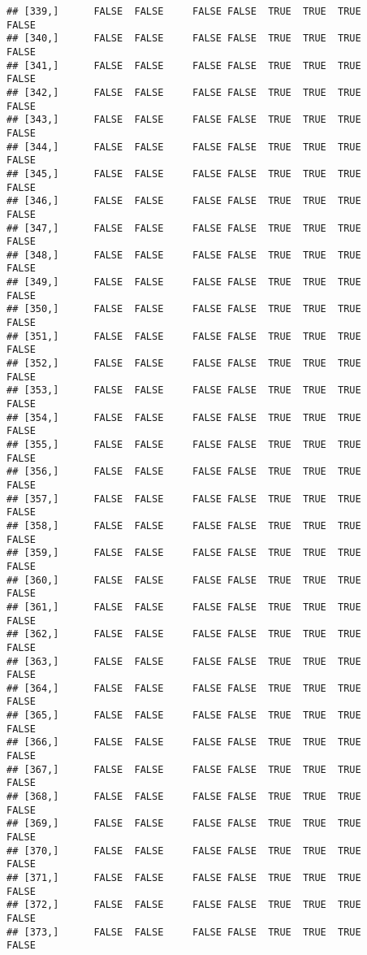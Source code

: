 \documentclass[
]{article}
\begin{document}
\begin{verbatim}
## [339,]      FALSE  FALSE     FALSE FALSE  TRUE  TRUE  TRUE         FALSE
## [340,]      FALSE  FALSE     FALSE FALSE  TRUE  TRUE  TRUE         FALSE
## [341,]      FALSE  FALSE     FALSE FALSE  TRUE  TRUE  TRUE         FALSE
## [342,]      FALSE  FALSE     FALSE FALSE  TRUE  TRUE  TRUE         FALSE
## [343,]      FALSE  FALSE     FALSE FALSE  TRUE  TRUE  TRUE         FALSE
## [344,]      FALSE  FALSE     FALSE FALSE  TRUE  TRUE  TRUE         FALSE
## [345,]      FALSE  FALSE     FALSE FALSE  TRUE  TRUE  TRUE         FALSE
## [346,]      FALSE  FALSE     FALSE FALSE  TRUE  TRUE  TRUE         FALSE
## [347,]      FALSE  FALSE     FALSE FALSE  TRUE  TRUE  TRUE         FALSE
## [348,]      FALSE  FALSE     FALSE FALSE  TRUE  TRUE  TRUE         FALSE
## [349,]      FALSE  FALSE     FALSE FALSE  TRUE  TRUE  TRUE         FALSE
## [350,]      FALSE  FALSE     FALSE FALSE  TRUE  TRUE  TRUE         FALSE
## [351,]      FALSE  FALSE     FALSE FALSE  TRUE  TRUE  TRUE         FALSE
## [352,]      FALSE  FALSE     FALSE FALSE  TRUE  TRUE  TRUE         FALSE
## [353,]      FALSE  FALSE     FALSE FALSE  TRUE  TRUE  TRUE         FALSE
## [354,]      FALSE  FALSE     FALSE FALSE  TRUE  TRUE  TRUE         FALSE
## [355,]      FALSE  FALSE     FALSE FALSE  TRUE  TRUE  TRUE         FALSE
## [356,]      FALSE  FALSE     FALSE FALSE  TRUE  TRUE  TRUE         FALSE
## [357,]      FALSE  FALSE     FALSE FALSE  TRUE  TRUE  TRUE         FALSE
## [358,]      FALSE  FALSE     FALSE FALSE  TRUE  TRUE  TRUE         FALSE
## [359,]      FALSE  FALSE     FALSE FALSE  TRUE  TRUE  TRUE         FALSE
## [360,]      FALSE  FALSE     FALSE FALSE  TRUE  TRUE  TRUE         FALSE
## [361,]      FALSE  FALSE     FALSE FALSE  TRUE  TRUE  TRUE         FALSE
## [362,]      FALSE  FALSE     FALSE FALSE  TRUE  TRUE  TRUE         FALSE
## [363,]      FALSE  FALSE     FALSE FALSE  TRUE  TRUE  TRUE         FALSE
## [364,]      FALSE  FALSE     FALSE FALSE  TRUE  TRUE  TRUE         FALSE
## [365,]      FALSE  FALSE     FALSE FALSE  TRUE  TRUE  TRUE         FALSE
## [366,]      FALSE  FALSE     FALSE FALSE  TRUE  TRUE  TRUE         FALSE
## [367,]      FALSE  FALSE     FALSE FALSE  TRUE  TRUE  TRUE         FALSE
## [368,]      FALSE  FALSE     FALSE FALSE  TRUE  TRUE  TRUE         FALSE
## [369,]      FALSE  FALSE     FALSE FALSE  TRUE  TRUE  TRUE         FALSE
## [370,]      FALSE  FALSE     FALSE FALSE  TRUE  TRUE  TRUE         FALSE
## [371,]      FALSE  FALSE     FALSE FALSE  TRUE  TRUE  TRUE         FALSE
## [372,]      FALSE  FALSE     FALSE FALSE  TRUE  TRUE  TRUE         FALSE
## [373,]      FALSE  FALSE     FALSE FALSE  TRUE  TRUE  TRUE         FALSE

\end{verbatim}
\end{document}
